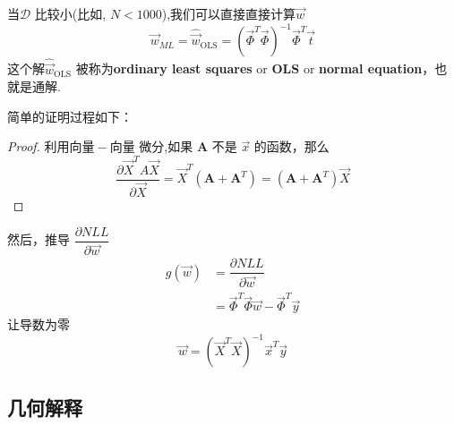 \documentclass[a4paper]{article}
\begin{document}
当$\mathcal{D}$ 比较小(比如, $N < 1000$),我们可以直接直接计算$\vec{w}$
\begin{equation}
\vec{w}_{ML}=\hat{\vec{w}}_{\mathrm{OLS}}=(\vec{\Phi}^T\vec{\Phi})^{-1}\vec{\Phi}^T\vec{t}
\end{equation}
这个解$\hat{\vec{w}}_{\mathrm{OLS}}$ 被称为\textbf{ordinary least squares} or \textbf{OLS} or \textbf{normal equation}，也就是通解.

简单的证明过程如下：
\begin{proof}
	利用$\mathbf{向量-向量}$ 微分,如果 $\mathbf{A}$ 不是 $\vec{x}$ 的函数，那么
	\begin{equation}
	\dfrac{\partial\vec{X}^TA\vec{X}}{\partial\vec{X}} = \vec{X}^T(\mathbf{A}+\mathbf{A}^T) = (\mathbf{A}+\mathbf{A}^T)\vec{X}
	\end{equation}
\end{proof}
然后，推导 $\dfrac{\partial NLL}{\partial \vec{w}}$
\begin{eqnarray}
g(\vec{w}) &= \dfrac{\partial NLL}{\partial\vec{w}} \\
&=\vec{\Phi}^T\vec{\Phi}\vec{w} - \vec{\Phi}^T\vec{y}			
\end{eqnarray}
让导数为零
\begin{equation}
\vec{w} = (\vec{X}^T\vec{X})^{-1}\vec{x}^T\vec{y}
\end{equation}

\subsection{几何解释}
\end{document}
